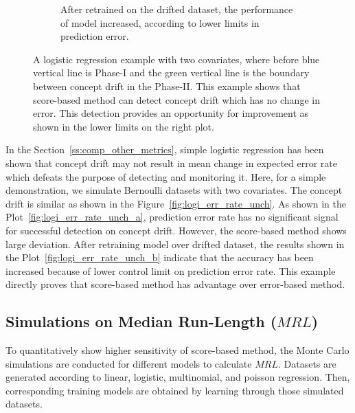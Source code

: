 \documentclass[twoside,11pt]{article}
\begin{document}
\begin{figure}[!htp]
\begin{subfigure}[t]{0.49\linewidth}
         \caption{After retrained on the drifted dataset, the performance of model increased, according to lower limits in prediction error.}
         \label{fig:exp_no_err_ch_b}
  \end{subfigure}
  \caption{A logistic regression example with two covariates, where before blue vertical line is Phase-I and the green vertical line is the boundary between concept drift in the Phase-II. This example shows that score-based method can detect concept drift which has no change in error. This detection provides an opportunity for improvement as shown in the lower limits on the right plot.}
  \label{fig:exp_no_err_ch}
\end{figure}
In the Section~\ref{ss:comp_other_metrics}, simple logistic regression has been shown that concept drift may not result in mean change in expected error rate which defeats the purpose of detecting and monitoring it. Here, for a simple demonstration, we simulate Bernoulli datasets with two covariates. The concept drift is similar as shown in the Figure~\ref{fig:logi_err_rate_unch}. As shown in the Plot~\ref{fig:logi_err_rate_unch_a}, prediction error rate has no significant signal for successful detection on concept drift. However, the score-based method shows large deviation. After retraining model over drifted dataset, the results shown in the Plot~\ref{fig:logi_err_rate_unch_b} indicate that the accuracy has been increased because of lower control limit on prediction error rate. This example directly proves that score-based method has advantage over error-based method. 

\subsection{Simulations on Median Run-Length ($MRL$)}
\label{ss:simu_MRL}
To quantitatively show higher sensitivity of score-based method, the Monte Carlo simulations are conducted for different models to calculate $MRL$. Datasets are generated according to linear, logistic, multinomial, and poisson regression. Then, corresponding training models are obtained by learning through those simulated datasets.
\end{document}
